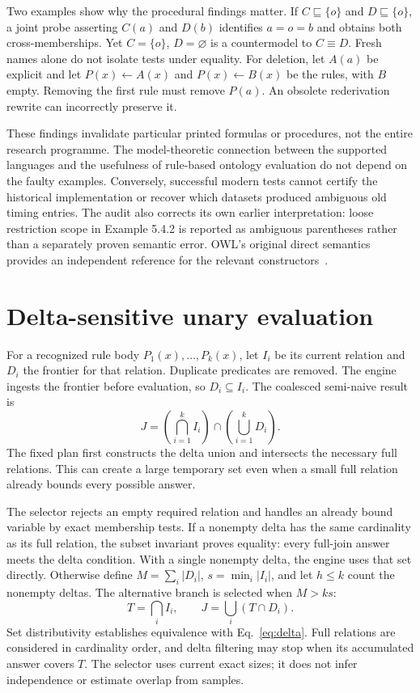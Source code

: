 \documentclass{article}
\begin{document}
Two examples show why the procedural findings matter. If
$C\sqsubseteq\{o\}$ and $D\sqsubseteq\{o\}$, a joint probe asserting $C(a)$ and
$D(b)$ identifies $a=o=b$ and obtains both cross-memberships. Yet $C=\{o\}$,
$D=\varnothing$ is a countermodel to $C\equiv D$. Fresh names alone do not
isolate tests under equality. For deletion, let $A(a)$ be explicit and let
$P(x)\leftarrow A(x)$ and $P(x)\leftarrow B(x)$ be the rules, with $B$ empty.
Removing the first rule must remove $P(a)$. An obsolete rederivation rewrite
can incorrectly preserve it.

These findings invalidate particular printed formulas or procedures, not the
entire research programme. The model-theoretic connection between the supported
languages and the usefulness of rule-based ontology evaluation do not depend
on the faulty examples. Conversely, successful modern tests cannot certify the
historical implementation or recover which datasets produced ambiguous old
timing entries. The audit also corrects its own earlier interpretation: loose
restriction scope in Example 5.4.2 is reported as ambiguous parentheses rather
than a separately proven semantic error. OWL's original direct semantics
provides an independent reference for the relevant constructors~\cite{owl2004}.

\section{Delta-sensitive unary evaluation}
For a recognized rule body $P_1(x),\ldots,P_k(x)$, let $I_i$ be its current
relation and $D_i$ the frontier for that relation. Duplicate predicates are
removed. The engine ingests the frontier before evaluation, so $D_i\subseteq I_i$.
The coalesced semi-naive result is
\begin{equation}
 J=\left(\bigcap_{i=1}^{k}I_i\right)\cap
   \left(\bigcup_{i=1}^{k}D_i\right).
 \label{eq:delta}
\end{equation}
The fixed plan first constructs the delta union and intersects the necessary
full relations. This can create a large temporary set even when a small full
relation already bounds every possible answer.

The selector rejects an empty required relation and handles an already bound
variable by exact membership tests. If a nonempty delta has the same cardinality
as its full relation, the subset invariant proves equality: every full-join
answer meets the delta condition. With a single nonempty delta, the engine uses
that set directly. Otherwise define $M=\sum_i|D_i|$, $s=\min_i|I_i|$, and let
$h\leq k$ count the nonempty deltas. The alternative branch is selected when
$M>ks$:
\begin{equation}
 T=\bigcap_i I_i, \qquad J=\bigcup_i(T\cap D_i).
 \label{eq:fullfirst}
\end{equation}
Set distributivity establishes equivalence with Eq.~\eqref{eq:delta}. Full
relations are considered in cardinality order, and delta filtering may stop
when its accumulated answer covers $T$. The selector uses current exact sizes;
it does not infer independence or estimate overlap from samples.
\end{document}
